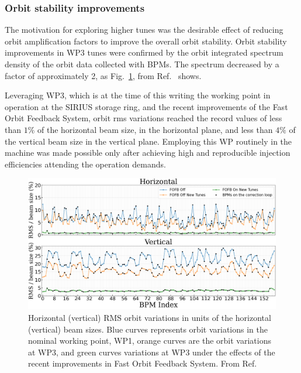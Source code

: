 \subsubsection{Orbit stability improvements}
The motivation for exploring higher tunes was the desirable effect of reducing orbit amplification factors to improve the overall orbit stability. Orbit stability improvements in WP3 tunes were confirmed by the orbit integrated spectrum density of the orbit data collected with BPMs. The spectrum decreased by a factor of approximately 2, as Fig.~\ref{fig:integrated_spec}, from Ref.~\cite{liu_status_2023} shows.

Leveraging WP3, which is at the time of this writing the working point in operation at the SIRIUS storage ring, and the recent improvements of the Fast Orbit Feedback System, orbit rms variations reached the record values of less than $1\%$ of the horizontal beam size, in the horizontal plane, and less than $4\%$ of the vertical beam size in the vertical plane. Employing this WP routinely in the machine was made possible only after achieving high and reproducible injection efficiencies attending the operation demands.

\begin{figure}[htb]
    \centering
    \includegraphics[width=\textwidth]{Images/WEOGA2_f5.png}
    \caption[Horizontal (vertical) RMS orbit variations in units of the horizontal (vertical) beam sizes.]{Horizontal (vertical) RMS orbit variations in units of the horizontal (vertical) beam sizes. Blue curves represents orbit variations in the nominal working point, WP1, orange curves are the orbit variations at WP3, and green curves variations at WP3 under the effects of the recent improvements in Fast Orbit Feedback System. From Ref.~\cite{liu_status_2023}}
    \label{fig:integrated_spec}
\end{figure}

